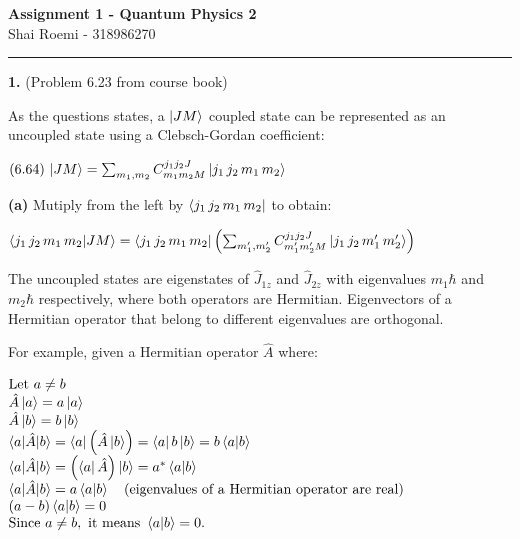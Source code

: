\documentclass[14pt]{extarticle}
\makeatletter
\newenvironment{lefteqs}{%
    \begin{flushleft}%
    \renewcommand{\arraystretch}{1.3}%
    $\begin{array}{@{}l@{}}%
}{%
    \end{array}$%
    \end{flushleft}%
}
\makeatother
\begin{document}
\begin{center}
    {\LARGE \textbf{Assignment 1 - Quantum Physics 2}}\\[0.5em]
    {\large Shai Roemi - 318986270}\\[0.3em]
\end{center}

\hrule
\vspace{2em}

\textbf{\large 1.}
(Problem 6.23 from course book)

As the questions states, a $\ket{J M}$ coupled state can be represented as an uncoupled state using a Clebsch-Gordan coefficient:

\begin{lefteqs}
    (6.64) \, \ket{J M} = \sum_{m_1, m_2} C^{j_1 j_2 J}_{m_1 m_2 M} \ket{j_1 \, j_2 \, m_1 \, m_2}
\end{lefteqs}

\textbf{(a)} Mutiply from the left by $\bra{j_1 \, j_2 \, m_1 \, m_2}$ to obtain:

\begin{lefteqs}
    \braket{j_1 \, j_2 \, m_1 \, m_2 | J M} = \bra{j_1 \, j_2 \, m_1 \, m_2} \left( \sum_{m_1', m_2'} C^{j_1 j_2 J}_{m_1' m_2' M}  \ket{j_1 \, j_2 \, m_1' \, m_2'}  \right) \\
\end{lefteqs}

The uncoupled states are eigenstates of $\hat{J}_{1z}$ and $\hat{J}_{2z}$ with eigenvalues $m_1 \hbar$ and $m_2 \hbar$ respectively,
where both operators are Hermitian. Eigenvectors of a Hermitian operator that belong to different eigenvalues are orthogonal.

For example, given a Hermitian operator $\hat{A}$ where:
\begin{lefteqs}
    \text{Let } a \neq b \\
    \hat{A} \ket{a} = a \ket{a} \\
    \hat{A} \ket{b} = b \ket{b} \\
    \braket{a | \hat{A} | b} = \bra{a} \left( \hat{A} \ket{b} \right) = \bra{a} b \ket{b} = b \braket{a | b} \\
    \braket{a | \hat{A} | b} = \left( \bra{a} \hat{A} \right) \ket{b} = a^* \braket{a | b} \\
    \braket{a | \hat{A} | b} = a \braket{a | b} \quad\text{(eigenvalues of a Hermitian operator are real)} \\
    (a - b) \braket{a | b} = 0 \\
    \text{Since } a \neq b, \text{ it means } \braket{a | b} = 0.
\end{lefteqs}
\end{document}
